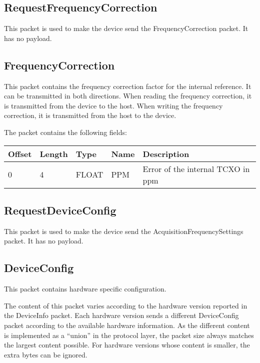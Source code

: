 \documentclass[a4paper,11pt]{article}
\begin{document}
\subsection{RequestFrequencyCorrection}
This packet is used to make the device send the FrequencyCorrection packet. It has no payload.

\subsection{FrequencyCorrection}
This packet contains the frequency correction factor for the internal reference. It can be transmitted in both directions. When reading the frequency correction, it is transmitted from the device to the host. When writing the frequency correction, it is transmitted from the host to the device.

The packet contains the following fields:
\begin{ThreePartTable}
\setlength\tabcolsep{3pt}

\begin{longtable}{p{} |  p{}  |  p{}| p{} | p{}}
\toprule
\textbf{Offset} &\textbf{Length} &\textbf{Type} & \textbf{Name} &\textbf{Description} \\ 
\hline
\endhead
\midrule[\heavyrulewidth]
\endfoot  
\midrule[\heavyrulewidth]
\endlastfoot

0 & 4 & FLOAT & PPM & Error of the internal TCXO in ppm \\
\end{longtable}   
\end{ThreePartTable}

\subsection{RequestDeviceConfig}
This packet is used to make the device send the AcquisitionFrequencySettings packet. It has no payload.

\subsection{DeviceConfig}
This packet contains hardware specific configuration.

The content of this packet varies according to the hardware version reported in the DeviceInfo packet. Each hardware version sends a different DeviceConfig packet according to the available hardware information. As the different content is implemented as a ``union'' in the protocol layer, the packet size always matches the largest content possible. For hardware versions whose content is smaller, the extra bytes can be ignored.
\end{document}

